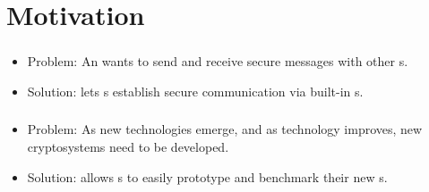 
\section{Motivation}
\frame{\sectionpage}


\begin{frame} %
\frametitle{\eu}
\begin{itemize}
\item Problem: An \eu{} wants to send and receive
  secure messages with other \eu s.
\item Solution: \cry{} lets \eu s establish
  secure communication via built-in \cs s.
\end{itemize}
\end{frame}

\begin{frame}
\frametitle{\cg}
\begin{itemize}
\item Problem: As new technologies emerge, and as
  technology improves, new cryptosystems need to
  be developed.
\item Solution: \cry{} allows \cg s to easily prototype
  and benchmark their new \cs s.
\end{itemize}
\end{frame}

